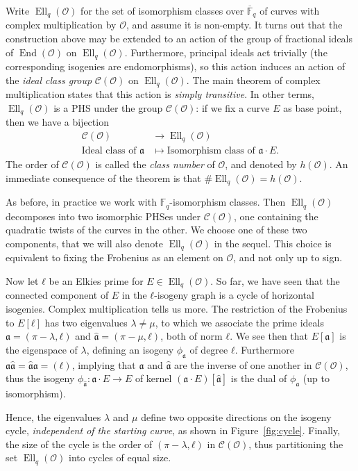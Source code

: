 \documentclass{llncs}
\newcommand{\F}{\mathbb{F}}
\newcommand{\Fbar}{\overline{\mathbb{F}}}
\newcommand{\Cl}{\mathcal{C}}
\renewcommand{\O}{\mathcal{O}}
\renewcommand{\frak}{\mathfrak}
\DeclareMathOperator{\End}{End}
\DeclareMathOperator{\Ell}{Ell}
\begin{document}
Write $\Ell_q(\O)$ for the set of isomorphism classes over $\Fbar_q$
of curves with complex multiplication by $\O$, and assume it is non-empty. 
It turns out that the construction above may be extended
to an action of the group of fractional ideals of $\End(\O)$ on $\Ell_q(\O)$.
Furthermore, principal ideals act trivially 
(the corresponding isogenies are endomorphisms), 
so this action induces an action of the \emph{ideal
  class group} $\Cl(\O)$ on $\Ell_q(\O)$.  The main theorem of complex
multiplication states that this action is \emph{simply transitive}. In
other terms, $\Ell_q(\O)$ is a PHS
under the group $\Cl(\O)$: if we fix a curve $E$ as base point,
then we have a bijection
\[
\begin{aligned}
\Cl(\O) &\longrightarrow \Ell_q(\O) \\
\text{Ideal class of }\frak a &\longmapsto \text{Isomorphism class of }\frak a\cdot E.
\end{aligned}
\]
The order of $\Cl(\O)$ is called the \emph{class number} of $\O$, and
denoted by $h(\O)$. An immediate consequence of the theorem is that
$\#\Ell_q(\O)=h(\O)$.

As before, in practice we work with $\F_q$-isomorphism classes.
Then $\Ell_q(\O)$ decomposes into two isomorphic PHSes under $\Cl(\O)$,
one containing the quadratic twists of the curves in the other. 
We choose one of these
two components, that we will also denote $\Ell_q(\O)$ in the sequel.
This choice is equivalent to fixing the Frobenius as an element on $\O$,
and not only up to sign. 

Now let $ℓ$ be an Elkies prime for $E\in\Ell_q(\O)$. So far, we have seen that the
connected component of $E$ in the $ℓ$-isogeny graph is a cycle of
horizontal isogenies. Complex multiplication tells us more. The
restriction of the Frobenius to $E[ℓ]$ has two eigenvalues $λ≠μ$, to
which we associate the prime ideals $\frak a=(π-λ,ℓ)$ and
$\hat{\frak a}=(π-μ,ℓ)$, both of norm $ℓ$. We see then that
$E[\frak a]$ is the eigenspace of $λ$, defining an isogeny
$ϕ_{\frak{a}}$ of degree $ℓ$. Furthermore
$\frak a\hat{\frak a} = \hat{\frak a}\frak a = (ℓ)$, implying that
$\frak a$ and $\hat{\frak a}$ are the inverse of one another in
$\Cl(\O)$, thus the isogeny $ϕ_{\hat{\frak a}}:\frak a·E→E$ of
kernel $(\frak a·E)[\hat{\frak a}]$ is the dual of $ϕ_{\frak a}$ (up
to isomorphism). 

Hence, 
the eigenvalues $λ$ and $μ$ define two opposite directions on the isogeny cycle,
\emph{independent of the starting curve},
as shown in Figure~\ref{fig:cycle}.  
Finally, the size of the cycle is the order of $(π-λ,ℓ)$ in $\Cl(\O)$,
thus partitioning the set $\Ell_q(\O)$ into cycles of equal size.
\end{document}
